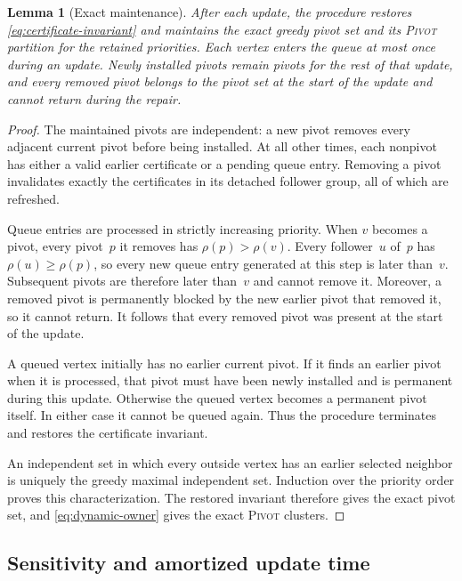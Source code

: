 \documentclass[11pt,letterpaper]{article}
\newtheorem{lemma}[theorem]{Lemma}
\theoremstyle{definition}
\theoremstyle{remark}
\newcommand{\1}{\mathbf{1}}
\newcommand{\Pivot}{\textnormal{\textsc{Pivot}}}
\begin{document}
\begin{lemma}[Exact maintenance]\label{lem:dynamic-correctness}
After each update, the procedure restores \cref{eq:certificate-invariant} and maintains the exact greedy pivot set and its \Pivot{} partition for the retained priorities.  Each vertex enters the queue at most once during an update.  Newly installed pivots remain pivots for the rest of that update, and every removed pivot belongs to the pivot set at the start of the update and cannot return during the repair.
\end{lemma}

\begin{proof}
The maintained pivots are independent: a new pivot removes every adjacent current pivot before being installed.  At all other times, each nonpivot has either a valid earlier certificate or a pending queue entry.  Removing a pivot invalidates exactly the certificates in its detached follower group, all of which are refreshed.

Queue entries are processed in strictly increasing priority.  When $v$ becomes a pivot, every pivot~$p$ it removes has $\rho(p)>\rho(v)$.  Every follower~$u$ of~$p$ has $\rho(u)\ge\rho(p)$, so every new queue entry generated at this step is later than~$v$.  Subsequent pivots are therefore later than~$v$ and cannot remove it.  Moreover, a removed pivot is permanently blocked by the new earlier pivot that removed it, so it cannot return.  It follows that every removed pivot was present at the start of the update.

A queued vertex initially has no earlier current pivot.  If it finds an earlier pivot when it is processed, that pivot must have been newly installed and is permanent during this update.  Otherwise the queued vertex becomes a permanent pivot itself.  In either case it cannot be queued again.  Thus the procedure terminates and restores the certificate invariant.

An independent set in which every outside vertex has an earlier selected neighbor is uniquely the greedy maximal independent set.  Induction over the priority order proves this characterization.  The restored invariant therefore gives the exact pivot set, and \cref{eq:dynamic-owner} gives the exact \Pivot{} clusters.
\end{proof}

\subsection{Sensitivity and amortized update time}
\end{document}
